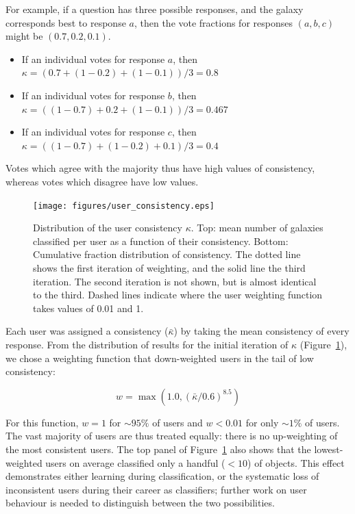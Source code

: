 \documentclass[useAMS,usenatbib]{mn2e}
\begin{document}
For example, if a question has three possible responses, and the galaxy corresponds best to response $a$, then the vote fractions for responses $(a, b, c)$ might be $(0.7, 0.2, 0.1)$.
\begin{itemize}
\item If an individual votes for response $a$, then \\$\kappa = (0.7 + (1-0.2) + (1-0.1))/3 = 0.8$
\item If an individual votes for response $b$, then \\$\kappa = ((1-0.7) + 0.2 + (1-0.1))/3 = 0.467$
\item If an individual votes for response $c$, then \\$\kappa = ((1-0.7) + (1-0.2) + 0.1)/3 = 0.4$
\end{itemize}
\noindent Votes which agree with the majority thus have high values of consistency, whereas votes which disagree have low values.

\begin{figure}
\texttt{[image: figures/user\_consistency.eps]}
\caption{Distribution of the user consistency $\kappa$. Top: mean number of galaxies classified per user as a function of their consistency. Bottom: Cumulative fraction distribution of consistency. The dotted line shows the first iteration of weighting, and the solid line the third iteration. The second iteration is not shown, but is almost identical to the third. Dashed lines indicate where the user weighting function takes values of 0.01 and 1. %
\label{fig-consistency}}
\end{figure}

Each user was assigned a consistency ($\bar{\kappa}$) by taking the mean consistency of every response. From the distribution of results for the initial iteration of $\kappa$ (Figure~\ref{fig-consistency}), we chose a weighting function that down-weighted users in the tail of low consistency:

\begin{equation}
w = \max \left(1.0,(\bar{\kappa} / 0.6)^{8.5} \right)
\label{eqn-weight}
\end{equation}

\noindent For this function, $w=1$ for $\sim95\%$ of users and $w<0.01$ for only $\sim1\%$ of users. The vast majority of users are thus treated equally: there is no up-weighting of the most consistent users. The top panel of Figure~\ref{fig-consistency} also shows that the lowest-weighted users on average classified only a handful ($<10$) of objects. This effect demonstrates either learning during classification, or the systematic loss of inconsistent users during their career as classifiers; further work on user behaviour is needed to distinguish between the two possibilities.
\end{document}
